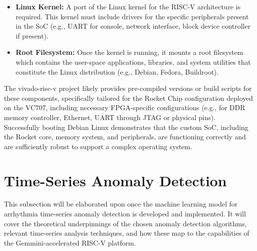 \begin{itemize}
    \item \textbf{Linux Kernel:} A port of the Linux kernel for the RISC-V architecture is required. This kernel must include drivers for the specific peripherals present in the SoC (e.g., UART for console, network interface, block device controller if present).

    \item \textbf{Root Filesystem:} Once the kernel is running, it mounts a root filesystem which contains the user-space applications, libraries, and system utilities that constitute the Linux distribution (e.g., Debian, Fedora, Buildroot).
\end{itemize}

The vivado-risc-v project likely provides pre-compiled versions or build scripts for these components, specifically tailored for the Rocket Chip configuration deployed on the VC707, including necessary FPGA-specific configurations (e.g., for DDR memory controller, Ethernet, UART through JTAG or physical pins). Successfully booting Debian Linux demonstrates that the custom SoC, including the Rocket core, memory system, and peripherals, are functioning correctly and are sufficiently robust to support a complex operating system.

\section{Time-Series Anomaly Detection}
\label{sec:time_series_anomaly}

This subsection will be elaborated upon once the machine learning model for arrhythmia time-series anomaly detection is developed and implemented. It will cover the theoretical underpinnings of the chosen anomaly detection algorithms, relevant time-series analysis techniques, and how these map to the capabilities of the Gemmini-accelerated RISC-V platform.